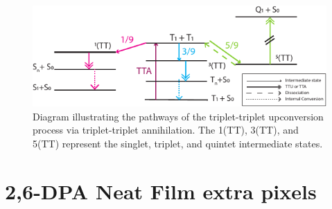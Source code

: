 \documentclass[
  letterpaper,
  DIV=11,
  numbers=noendperiod,
  oneside]{scrreprt}
\begin{document}
\begin{figure}

{\centering \includegraphics{./images/Asset 5.pdf}

}

\caption{Diagram illustrating the pathways of the triplet-triplet
upconversion process via triplet-triplet annihilation. The {1(TT)},
{3(TT)}, and {5(TT)} represent the singlet, triplet, and quintet
intermediate states.}

\end{figure}

\hypertarget{apen-dpaextra}{%
\section{2,6-DPA Neat Film extra pixels}\label{apen-dpaextra}}
\end{document}
